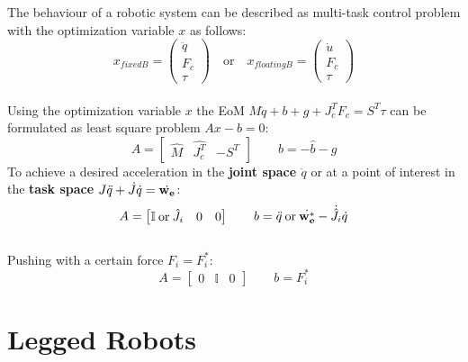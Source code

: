 \documentclass[a4paper, 8pt]{extarticle}
\begin{document}
\begin{multicols*}{3}
The behaviour of a robotic system can be described as multi-task control problem with the optimization variable $x$ as follows:
$$ x_{fixed B}=\begin{pmatrix} \ddot{q} \\ F_{c} \\ \tau \end{pmatrix} \quad \textrm{or} \quad x_{floating B}=\begin{pmatrix} \dot{u} \\ F_{c} \\ \tau \end{pmatrix}$$\\
Using the optimization variable $x$ the EoM \newline $M\ddot{q}+b+g+J_{c}^{T}F_{c}=S^{T}\tau$ can be formulated as least square problem $Ax-b=0$:
$$A=\begin{bmatrix} \hat{M} & \hat{J_{c}^{T}} & -S^{T} \end{bmatrix} \quad \quad b=-\hat{b}-\hat{g}$$
To achieve a desired acceleration in the \textbf{joint space $\ddot{q}$} or at a point of interest in the \textbf{task space $J\ddot{q}+\dot{J}\dot{q}=\dot{\bf w_{e}}$}:
$$ A=\begin{bmatrix} \mathbb{I} \: \textrm{or} \: \hat{J_{i}} & 0 & 0 \end{bmatrix} \quad \quad b=\ddot{q} \: \textrm{or} \: \dot{\bf w_{e}^*}-\dot{\hat{J_{i}}}\dot{q}$$\\
Pushing with a certain force $F_{i}=F_{i}^*$:
$$A=\begin{bmatrix} 0 & \mathbb{I} & 0 \end{bmatrix} \quad \quad b=F_{i}^*$$

\section{Legged Robots}

\end{multicols*}
\end{document}
